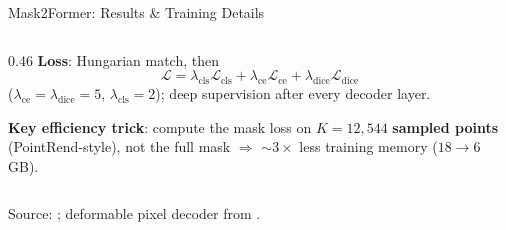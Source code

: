 \begin{frame}{Mask2Former: Results \& Training Details}
\begin{columns}[t]
\begin{column}{0.46\textwidth}
      \vspace{0.4em}
      \textbf{Loss}: Hungarian match, then
      \[
        \mathcal{L} = \lambda_\text{cls}\mathcal{L}_\text{cls} + \lambda_\text{ce}\mathcal{L}_\text{ce} + \lambda_\text{dice}\mathcal{L}_\text{dice}
      \]
      {\footnotesize ($\lambda_\text{ce}{=}\lambda_\text{dice}{=}5$, $\lambda_\text{cls}{=}2$); deep supervision after every decoder layer.}

      \vspace{0.4em}
      \textbf{Key efficiency trick}: compute the mask loss on $K{=}12{,}544$ \textbf{sampled points} (PointRend-style), not the full mask $\Rightarrow$ $\sim 3\times$ less training memory ($18\!\to\!6$ GB).
    \end{column}
  \end{columns}

  \vspace{0.3em}
  {\scriptsize Source: \textcite{cheng2022mask2former}; deformable pixel decoder from \textcite{zhu2021deformabledetr}.}
\end{frame}

